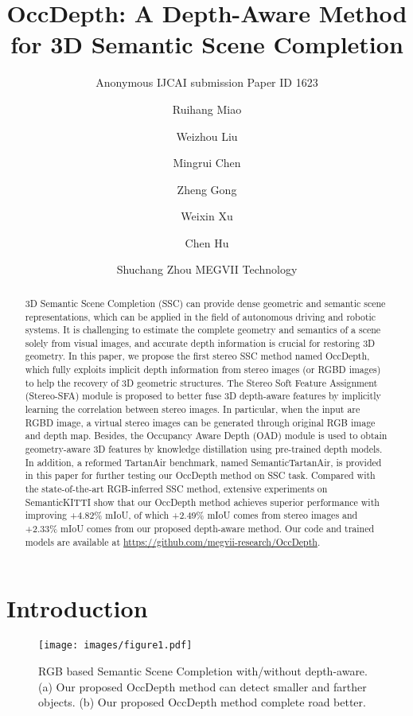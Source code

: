 \documentclass{article}
\title{OccDepth: A Depth-Aware Method for 3D Semantic Scene Completion}
\author{
	Anonymous IJCAI submission
	\affiliations
	Paper ID 1623
}
\author{
	Ruihang Miao\footnotemark[1]
	\and
	Weizhou Liu\footnotemark[1]\and
	Mingrui Chen\and
	Zheng Gong \and
	Weixin Xu  \and
	Chen Hu\footnotemark[2] \and
	Shuchang Zhou
	\affiliations
	MEGVII Technology
}
\begin{document}
	
	\maketitle
	\renewcommand{\thefootnote}{\fnsymbol{footnote}} 

	\begin{abstract}
    3D Semantic Scene Completion (SSC) can provide dense geometric and semantic scene representations, which can be applied in the field of autonomous driving and robotic systems. It is challenging to estimate the complete geometry and semantics of a scene solely from visual images, and accurate depth information is crucial for restoring 3D geometry. In this paper, we propose the first stereo SSC method named OccDepth, which fully exploits implicit depth information from stereo images (or RGBD images) to help the recovery of 3D geometric structures. The Stereo Soft Feature Assignment (Stereo-SFA) module is proposed to better fuse 3D depth-aware features by implicitly learning the correlation between stereo images. In particular, when the input are RGBD image, a virtual stereo images can be generated through original RGB image and depth map. Besides, the Occupancy Aware Depth (OAD) module is used to obtain geometry-aware 3D features by knowledge distillation using pre-trained depth models. In addition, a reformed TartanAir benchmark, named SemanticTartanAir, is provided in this paper for further testing our OccDepth method on SSC task.
	Compared with the state-of-the-art RGB-inferred SSC method, extensive experiments on SemanticKITTI show that our OccDepth method achieves superior performance with improving +4.82\% mIoU, of which +2.49\% mIoU comes from stereo images and +2.33\% mIoU comes from our proposed depth-aware method. Our code and trained models are available at \url{https://github.com/megvii-research/OccDepth}.
	\end{abstract}
 
 	\section{Introduction}
		\begin{figure}[!t]
		\centering
		\texttt{[image: images/figure1.pdf]}
		\caption{RGB based Semantic Scene Completion with/without depth-aware. (a) Our proposed OccDepth method can detect smaller and farther objects. (b) Our proposed OccDepth method complete road better.}
		\label{introShow}
	\end{figure}
 
\end{document}
